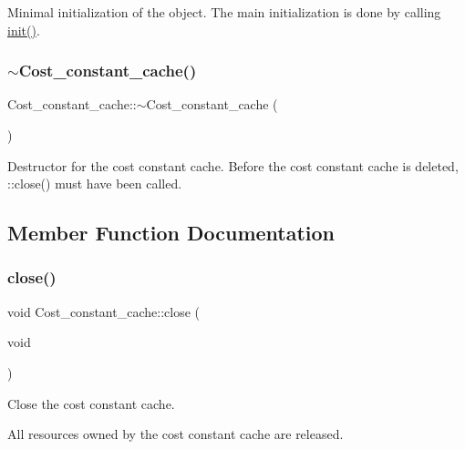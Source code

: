 Minimal initialization of the object. The main initialization is done by calling \mbox{\hyperlink{classCost__constant__cache_a27341cb9a16b958f01fc394f3c1c8118}{init()}}. \mbox{\label{classCost__constant__cache_a31b347d1012ee2fa400fecd7a2819b2b}} 
\subsubsection{\texorpdfstring{$\sim$\+Cost\+\_\+constant\+\_\+cache()}{~Cost\_constant\_cache()}}
{\footnotesize\ttfamily Cost\+\_\+constant\+\_\+cache\+::$\sim$\+Cost\+\_\+constant\+\_\+cache (\begin{DoxyParamCaption}{ }\end{DoxyParamCaption})}

Destructor for the cost constant cache. Before the cost constant cache is deleted, \+::close() must have been called. 

\subsection{Member Function Documentation}
\mbox{\label{classCost__constant__cache_a9606f8ca892056e98dd852f24994ee70}} 
\subsubsection{\texorpdfstring{close()}{close()}}
{\footnotesize\ttfamily void Cost\+\_\+constant\+\_\+cache\+::close (\begin{DoxyParamCaption}\item[{void}]{ }\end{DoxyParamCaption})}

Close the cost constant cache.

All resources owned by the cost constant cache are released. \mbox{\label{classCost__constant__cache_ade6946bec347063cbf5ad09cafbb97a0}} 
